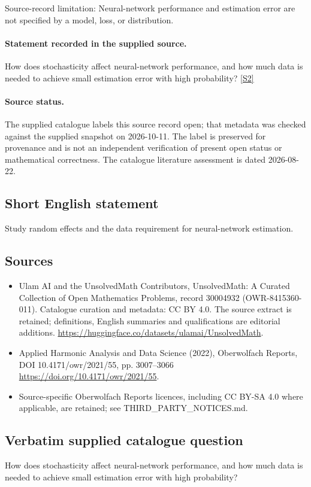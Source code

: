 \documentclass[11pt]{article}
\begin{document}
Source-record limitation: Neural-network performance and estimation error are not specified by a model, loss, or distribution.
\paragraph{Statement recorded in the supplied source.}
How does stochasticity affect neural-network performance, and how much data is needed to achieve small estimation error with high probability? \href{https://doi.org/10.4171/owr/2021/55}{[S2]}
\paragraph{Source status.}
The supplied catalogue labels this source record open; that metadata was checked against the supplied snapshot on 2026-10-11. The label is preserved for provenance and is not an independent verification of present open status or mathematical correctness. The catalogue literature assessment is dated 2026-08-22.
\subsection{Short English statement}
Study random effects and the data requirement for neural-network estimation.
\subsection{Sources}
\begin{itemize}
\item[S1] Ulam AI and the UnsolvedMath Contributors, UnsolvedMath: A Curated Collection of Open Mathematics Problems, record 30004932 (OWR-8415360-011). Catalogue curation and metadata: CC BY 4.0. The source extract is retained; definitions, English summaries and qualifications are editorial additions.
\url{https://huggingface.co/datasets/ulamai/UnsolvedMath}.
\item[S2] Applied Harmonic Analysis and Data Science (2022), Oberwolfach Reports, DOI 10.4171/owr/2021/55, pp. 3007--3066
\url{https://doi.org/10.4171/owr/2021/55}.
\item Source-specific Oberwolfach Reports licences, including CC BY-SA 4.0 where applicable, are retained; see THIRD\_PARTY\_NOTICES.md.
\end{itemize}
\subsection{Verbatim supplied catalogue question}
How does stochasticity affect neural-network performance, and how much data is needed to achieve small estimation error with high probability?
\end{document}
